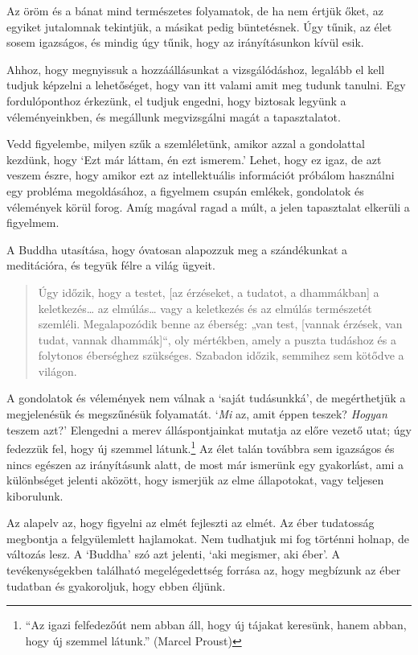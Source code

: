 Az öröm és a bánat mind természetes folyamatok, de ha nem értjük őket,
az egyiket jutalomnak tekintjük, a másikat pedig büntetésnek. Úgy tűnik,
az élet sosem igazságos, és mindig úgy tűnik, hogy az irányításunkon
kívül esik.

Ahhoz, hogy megnyissuk a hozzáállásunkat a vizsgálódáshoz, legalább el
kell tudjuk képzelni a lehetőséget, hogy van itt valami amit meg tudunk
tanulni. Egy fordulóponthoz érkezünk, el tudjuk engedni, hogy biztosak
legyünk a véleményeinkben, és megállunk megvizsgálni magát a
tapasztalatot.

Vedd figyelembe, milyen szűk a szemléletünk, amikor azzal a gondolattal
kezdünk, hogy `Ezt már láttam, én ezt ismerem.' Lehet, hogy ez igaz, de
azt veszem észre, hogy amikor ezt az intellektuális információt próbálom
használni egy probléma megoldásához, a figyelmem csupán emlékek,
gondolatok és vélemények körül forog. Amíg magával ragad a múlt, a jelen
tapasztalat elkerüli a figyelmem.

A Buddha utasítása, hogy óvatosan alapozzuk meg a szándékunkat a
meditációra, és tegyük félre a világ ügyeit.

\begin{quote}
Úgy időzik, hogy a testet, {[}az érzéseket, a tudatot, a dhammákban{]} a
keletkezés\ldots{} az elmúlás\ldots{} vagy a keletkezés és az elmúlás
természetét szemléli. Megalapozódik benne az éberség: „van test,
{[}vannak érzések, van tudat, vannak dhammák{]}``, oly mértékben, amely
a puszta tudáshoz és a folytonos éberséghez szükséges. Szabadon időzik,
semmihez sem kötődve a világon.

\bigskip

\end{quote}

A gondolatok és vélemények nem válnak a `saját tudásunkká', de
megérthetjük a megjelenésük és megszűnésük folyamatát. `\emph{Mi} az,
amit éppen teszek? \emph{Hogyan} teszem azt?' Elengedni a merev
álláspontjainkat mutatja az előre vezető utat; úgy fedezzük fel, hogy új
szemmel látunk.\footnote{``Az igazi felfedezőút nem abban áll, hogy új
  tájakat keresünk, hanem abban, hogy új szemmel látunk.'' (Marcel
  Proust)} Az élet talán továbbra sem igazságos és nincs egészen az
irányításunk alatt, de most már ismerünk egy gyakorlást, ami a
különbséget jelenti aközött, hogy ismerjük az elme állapotokat, vagy
teljesen kiborulunk.

Az alapelv az, hogy figyelni az elmét fejleszti az elmét. Az éber
tudatosság megbontja a felgyülemlett hajlamokat. Nem tudhatjuk mi fog
történni holnap, de változás lesz. A `Buddha' szó azt jelenti, `aki
megismer, aki éber'. A tevékenységekben található megelégedettség
forrása az, hogy megbízunk az éber tudatban és gyakoroljuk, hogy ebben
éljünk.
